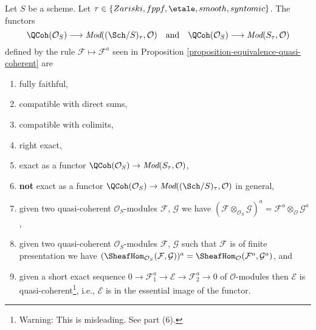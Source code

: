 \begin{lemma}
\label{lemma-equivalence-quasi-coherent-limits}
Let $S$ be a scheme.
Let $\tau \in \{Zariski, \linebreak[0] fppf, \linebreak[0]
\etale, \linebreak[0] smooth, \linebreak[0] syntomic\}$.
The functors
$$
\QCoh(\mathcal{O}_S)
\longrightarrow
\textit{Mod}((\Sch/S)_\tau, \mathcal{O})
\quad\text{and}\quad
\QCoh(\mathcal{O}_S)
\longrightarrow
\textit{Mod}(S_\tau, \mathcal{O})
$$
defined by the rule $\mathcal{F} \mapsto \mathcal{F}^a$ seen in
Proposition \ref{proposition-equivalence-quasi-coherent}
are
\begin{enumerate}
\item fully faithful,
\item compatible with direct sums,
\item compatible with colimits,
\item right exact,
\item exact as a functor
$\QCoh(\mathcal{O}_S) \to \textit{Mod}(S_\tau, \mathcal{O})$,
\item {\bf not} exact as a functor
$\QCoh(\mathcal{O}_S) \to
\textit{Mod}((\Sch/S)_\tau, \mathcal{O})$
in general,
\item given two quasi-coherent $\mathcal{O}_S$-modules
$\mathcal{F}$, $\mathcal{G}$ we have
$(\mathcal{F} \otimes_{\mathcal{O}_S} \mathcal{G})^a =
\mathcal{F}^a \otimes_\mathcal{O} \mathcal{G}^a$,
\item given two quasi-coherent $\mathcal{O}_S$-modules
$\mathcal{F}$, $\mathcal{G}$ such that $\mathcal{F}$
is of finite presentation we have
$(\SheafHom_{\mathcal{O}_S}(\mathcal{F}, \mathcal{G}))^a =
\SheafHom_\mathcal{O}(\mathcal{F}^a, \mathcal{G}^a)$, and
\item given a short exact sequence
$0 \to \mathcal{F}_1^a \to \mathcal{E} \to \mathcal{F}_2^a \to 0$
of $\mathcal{O}$-modules then $\mathcal{E}$ is
quasi-coherent\footnote{Warning: This is misleading. See part (6).}, i.e.,
$\mathcal{E}$ is in the essential image of the functor.
\end{enumerate}
\end{lemma}

